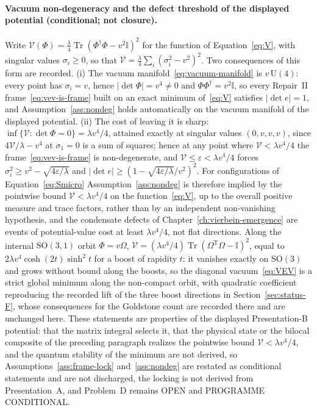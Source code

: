 \paragraph{Vacuum non-degeneracy and the defect threshold of the displayed potential (conditional; not closure).}
Write \(\mathcal V(\Phi)=\tfrac{\lambda}4\operatorname{Tr}(\Phi^\dagger\Phi-v^2\mathbb I)^2\) for the function of Equation~\eqref{eq:V}, with singular values \(\sigma_i\ge0\), so that \(\mathcal V=\tfrac{\lambda}4\sum_i(\sigma_i^2-v^2)^2\). Two consequences of this form are recorded. (i) The vacuum manifold~\eqref{eq:vacuum-manifold} is \(v\,\mathrm U(4)\): every point has \(\sigma_i=v\), hence \(|\det\Phi|=v^4\ne0\) and \(\Phi\Phi^\dagger=v^2\mathbb I\), so every Repair~II frame~\eqref{eq:vev-is-frame} built on an exact minimum of~\eqref{eq:V} satisfies \(|\det e|=1\), and Assumption~\ref{ass:nondeg} holds automatically on the vacuum manifold of the displayed potential. (ii) The cost of leaving it is sharp: \(\inf\{\mathcal V:\det\Phi=0\}=\lambda v^4/4\), attained exactly at singular values \((0,v,v,v)\), since \(4\mathcal V/\lambda-v^4\) at \(\sigma_1=0\) is a sum of squares; hence at any point where \(\mathcal V<\lambda v^4/4\) the frame~\eqref{eq:vev-is-frame} is non-degenerate, and \(\mathcal V\le\varepsilon<\lambda v^4/4\) forces \(\sigma_i^2\ge v^2-\sqrt{4\varepsilon/\lambda}\) and \(|\det e|\ge(1-\sqrt{4\varepsilon/\lambda}/v^2)^2\). For configurations of Equation~\eqref{eq:Smicro} Assumption~\ref{ass:nondeg} is therefore implied by the pointwise bound \(\mathcal V<\lambda v^4/4\) on the function~\eqref{eq:V}, up to the overall positive measure and trace factors, rather than by an independent non-vanishing hypothesis, and the condensate defects of Chapter~\ref{ch:vierbein-emergence} are events of potential-value cost at least \(\lambda v^4/4\), not flat directions. Along the internal \(\mathrm{SO}(3,1)\) orbit \(\Phi=v\Omega\), \(\mathcal V=(\lambda v^4/4)\operatorname{Tr}(\Omega^{\mathrm T}\Omega-\mathbb I)^2\), equal to \(2\lambda v^4\cosh(2t)\sinh^2t\) for a boost of rapidity \(t\): it vanishes exactly on \(\mathrm{SO}(3)\) and grows without bound along the boosts, so the diagonal vacuum~\eqref{eq:VEV} is a strict global minimum along the non-compact orbit, with quadratic coefficient reproducing the recorded lift of the three boost directions in Section~\ref{sec:status-F}, whose consequences for the Goldstone count are recorded there and are unchanged here. These statements are properties of the displayed Presentation-B potential: that the matrix integral selects it, that the physical state or the bilocal composite of the preceding paragraph realizes the pointwise bound \(\mathcal V<\lambda v^4/4\), and the quantum stability of the minimum are not derived, so Assumptions~\ref{ass:frame-lock} and~\ref{ass:nondeg} are restated as conditional statements and are not discharged, the locking is not derived from Presentation~A, and Problem~D remains OPEN and PROGRAMME CONDITIONAL.

